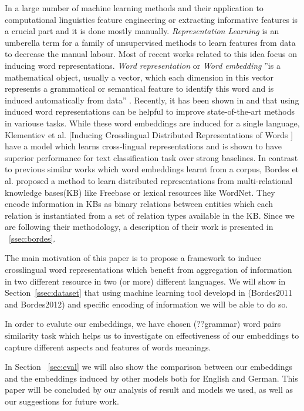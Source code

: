 \documentclass[11pt]{article}
\begin{document}
In a large number of machine learning methods and their application to computational linguistics
 feature engineering or extracting informative features is a crucial part
 and it is done mostly manually. \emph{ Representation Learning} is an umberella term
for a family of unsupervised methods to learn features from data to decrease the manual labour. Most of recent
works related to this idea focus on inducing word
representations. \emph{Word representation} or \emph{Word embedding} ''is a mathematical object, usually a
vector, which each dimension in this vector represents a grammatical or
semantical feature to identify this word and is induced automatically from data''
\cite{Turian2010b}. Recently, it has been shown in \cite{Turian2010b} and \cite{Collobert2011} that using
 induced word representations can be helpful to improve state-of-the-art methods in 
variouse tasks. While these word embeddings are induced for a single
language, Klementiev et al.
[Inducing Crosslingual Distributed Representations of Words ] have a model which
learns cross-lingual representations and is shown to have superior performance
for text classification task over strong baselines. In contrast to previous similar works which word
embeddings learnt from a corpus, Bordes et al. proposed a method
\cite{Bordes2011} to learn distributed representations from multi-relational knowledge bases(KB) like Freebase
or lexical resources like WordNet. 
They encode information in KBs as binary relations between entities which each relation
 is instantiated from a set of relation types available in the KB. Since we are following their methodology, 
 a description of their work is presented in ~\ref{ssec:bordes}.
 
 The main motivation of this paper is to propose a framework to induce crosslingual word representations 
 which benefit from aggregation of information in two 
  different resource in two (or more) different languages. We will show in Section~\ref{ssec:dataset} that using machine learning tool
  developd in (Bordes2011 and Bordes2012) and specific encoding of information we will be able to do so.
 
  In order to evalute our embeddings, we have chosen (??grammar) word pairs similarity task which 
  helps us to investigate on effectiveness of our embeddings to capture different aspects and features of words meanings.
     
  In Section ~\ref{sec:eval} we will also show the comparison between our embeddings and the embeddings 
  induced by other models both for English and German. This paper will be concluded by 
  our analysis of result and models we used, as well as our suggestions for future work.
  
\end{document}
